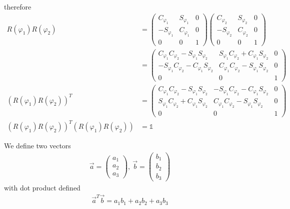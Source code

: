 \documentclass[11pt,a4paper]{article}
\begin{document}
\begin{enumerate}
therefore
\begin{align*}
R(\varphi_1)R(\varphi_2)
&=
\begin{pmatrix}
C_{\varphi_1} & S_{\varphi_1} & 0 \\
-S_{\varphi_1} & C_{\varphi_1} & 0 \\
0 & 0 & 1
\end{pmatrix}
\begin{pmatrix}
C_{\varphi_2} & S_{\varphi_2} & 0 \\
-S_{\varphi_2} & C_{\varphi_2} & 0 \\
0 & 0 & 1
\end{pmatrix} \\
&=
\begin{pmatrix}
C_{\varphi_1}C_{\varphi_2}-S_{\varphi_1}S_{\varphi_2} & S_{\varphi_1}C_{\varphi_2}+C_{\varphi_1}S_{\varphi_2} & 0 \\
-S_{\varphi_1}C_{\varphi_2}-C_{\varphi_1}S_{\varphi_2} & C_{\varphi_1}C_{\varphi_2}-S_{\varphi_1}S_{\varphi_2} & 0 \\
0 & 0 & 1
\end{pmatrix} \\
(R(\varphi_1)R(\varphi_2))^T
&=
\begin{pmatrix}
C_{\varphi_1}C_{\varphi_2}-S_{\varphi_1}S_{\varphi_2} & -S_{\varphi_1}C_{\varphi_2}-C_{\varphi_1}S_{\varphi_2} & 0 \\
S_{\varphi_1}C_{\varphi_2}+C_{\varphi_1}S_{\varphi_2} & C_{\varphi_1}C_{\varphi_2}-S_{\varphi_1}S_{\varphi_2} & 0 \\
0 & 0 & 1
\end{pmatrix} \\
(R(\varphi_1)R(\varphi_2))^T(R(\varphi_1)R(\varphi_2))&=\mathbb{1}
\end{align*}

\newpage

We define two vectors
\begin{align*}
\vec{a}=
\begin{pmatrix}
a_1 \\
a_2 \\
a_3
\end{pmatrix},\ 
\vec{b}=
\begin{pmatrix}
b_1 \\
b_2 \\
b_3
\end{pmatrix}
\end{align*}
with dot product defined
\begin{align*}
\vec{a}^T\vec{b}=a_1b_1+a_2b_2+a_3b_3
\end{align*}


\end{enumerate}
\end{document}
